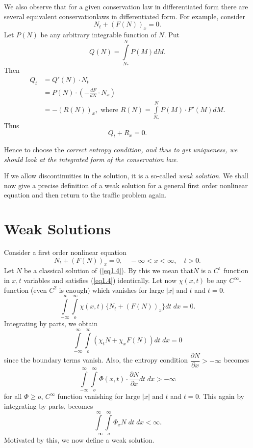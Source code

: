We also observe that for a given conservation law in differentiated form there are several equivalent conservation\pageoriginale laws in differentiated form. For example, consider 
$$
N_t + (F(N))_x = 0.
$$
Let $P(N)$ be any arbitrary integrable function of $N$. Put 
$$
Q(N) = \int\limits^N_{N_*} P(M) dM.
$$
Then 
\begin{align*}
Q_t & = Q'(N) \cdot N_t\\
& = P(N) \cdot (-\frac{dF}{dN} \cdot N_x)\\
& = -(R(N))_x, \text{ where } R(N) = \int\limits^N_{N_*} P(M) \cdot F' (M) dM.
\end{align*}
Thus
$$
Q_t + R_x =0.
$$

Hence to choose the {\em correct entropy condition, and thus to get
  uni\-queness, we should look at the integrated form of the
  conservation law.} 

If we allow discontinuities in the solution, it is a so-called {\em weak solution}. We shall now give a precise definition of a weak solution for a general first order nonlinear equation and then return to the traffic problem again.

\section{Weak Solutions}\label{chap1:sec1.2}

Consider a first order nonlinear equation
\begin{equation*}
N_t + (F(N))_x = 0, \quad - \infty < x < \infty, \quad t >0. \tag{1.4}\label{eq1.4}
\end{equation*}
Let $N$ be a classical solution of (\ref{eq1.4}). By this we mean that\pageoriginale $N$ is a $C^1$ function in $x,t$ variables and satisfies (\ref{eq1.4}) identically. Let now $\chi(x,t)$ be any $C^\infty$-function (even $C^2$ is enough) which vanishes for large $|x|$ and $t$ and $t =0$.
$$
\int\limits^\infty_{-\infty} \int\limits^\infty_o \chi (x,t) \{N_t + (F(N))_x\} dt \; dx = 0. 
$$
Integrating by parts, we obtain
\begin{equation*}
\int\limits^\infty_{-\infty} \int\limits^\infty_o (\chi_t N + \chi_x F(N)) dt \; dx = 0
\tag{1.5}\label{eq1.5}
\end{equation*}
since the boundary terms vanish. Also, the entropy condition $\dfrac{\partial N}{\partial x} > - \infty$ becomes
$$
\int\limits^\infty_{-\infty} \int\limits^\infty_o \Phi (x,t) \cdot \frac{\partial N}{\partial x} dt \; dx > - \infty
$$
for all $\Phi \geq o$, $C^\infty$ function vanishing for large $|x|$ and $t$ and $t=0$. This again by integrating by parts, becomes 
\begin{equation*}
\int\limits^\infty_{-\infty} \int\limits^\infty_o \Phi_x N \; dt \;  dx < \infty. 
\tag{1.6}\label{eq1.6}
\end{equation*}
Motivated by this, we now define a weak solution.

